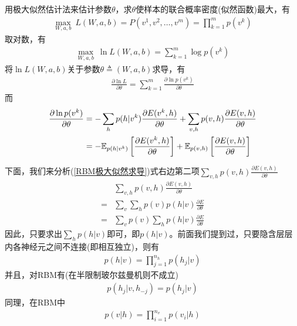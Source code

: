             用极大似然估计法来估计参数$\theta$，求$\theta$使样本的联合概率密度(似然函数)最大，有
            \begin{align*}
            \max_{W,a,b} \ L(W,a,b) = P(v^1,v^2,\dots,v^m) = \prod_{k=1}^mp(v^k)
            \end{align*}
            取对数，有
            \begin{align*}
            \max_{W,a,b} \ \ln L(W,a,b) = \sum_{k=1}^m \log p(v^k)
            \end{align*}
            将$\ln L(W,a,b)$关于参数$\theta\triangleq (W,a,b)$求导，有
            \begin{align*}
            \frac{\partial \ln L}{\partial \theta} = \sum_{k=1}^m \frac{\partial \ln p(v^k)}{\partial \theta}
            \end{align*}
            而
            \begin{align}
            \label{RBM极大似然求导}
            \frac{\partial \ln p(v^k)}{\partial \theta} & = -\sum_h p(h|v^k )\frac{\partial E(v^k,h)}{\partial \theta} + \sum_{v,h}p(v,h)\frac{\partial E(v,h)}{\partial \theta} \\
             & = - \mathbb{E}_{p(h|v^k)} \left[ \frac{\partial E(v^k,h)}{\partial\theta}  \right] + \mathbb{ E}_{p(v,h)} \left[ \frac{\partial E(v,h)}{\partial \theta}  \right] \notag
            \end{align}
            \par
            下面，我们来分析(\ref{RBM极大似然求导})式右边第二项$\sum_{v,h}p(v,h)\frac{\partial E(v,h)}{\partial \theta}$
            \begin{align*}
            & \sum_{v,h}p(v,h)\frac{\partial E(v,h)}{\partial \theta} \\
            ={}& \sum_v\sum_hp(v)p(h|v)\frac{\partial E}{\partial \theta}\\
            ={}& \sum_vp(v)\sum_hp(h|v)\frac{\partial E}{\partial \theta}
            \end{align*}
            因此，只要求出$\sum_hp(h|v)$即可，即$p(h|v)$。前面我们提到过，只要隐含层层内各神经元之间不连接(即相互独立)，则有
            \begin{align*}
            p(h|v) = \prod_{j=1}^{n_h}p(h_j|v)
            \end{align*}
            并且，对RBM有(在半限制玻尔兹曼机则不成立)
            \begin{align*}
            p(h_j|v ,h_{-j}) = p(h_j|v)
            \end{align*}
            同理，在RBM中
            \begin{align*}
            p(v|h) = \prod_{i=1}^{n_v}p(v_i|h)
            \end{align*}
